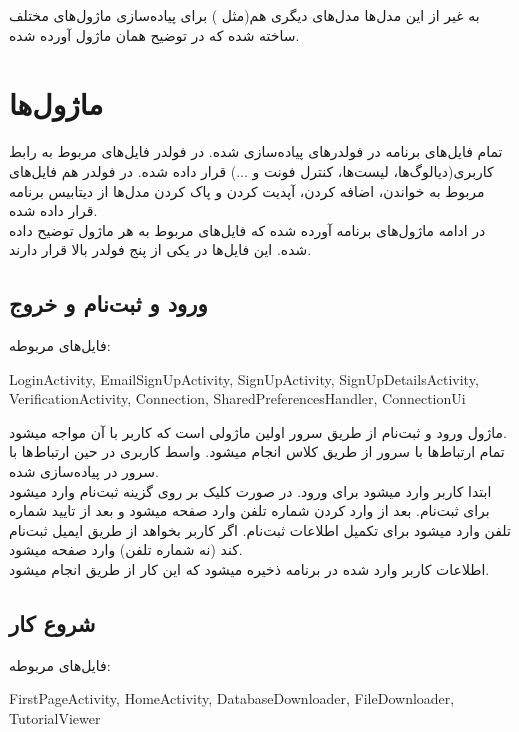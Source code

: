 \documentclass[11pt]{article}
\begin{document}
 به غیر از این مد‌ل‌ها مدل‌های دیگری هم(مثل  ) برای پیاده‌سازی ماژول‌های مختلف ساخته شده که در توضیح همان ماژول آورده شده.
 
 
\section{ماژول‌ها}
تمام فایل‌های برنامه در فولدر‌های 
پیاده‌سازی شده. در فولدر  فایل‌های مربوط به رابط کاربری(دیالوگ‌ها، لیست‌ها، کنترل فونت و ...) قرار داده شده. در فولدر  هم فایل‌های مربوط به خواندن، اضافه کردن، آپدیت کردن و پاک کردن مدل‌ها از دیتابیس برنامه قرار داده شده.\\
در ادامه ماژول‌های برنامه آورده شده که فایل‌های مربوط به هر ماژول توضیح داده شده. این فایل‌ها در یکی از پنج فولدر بالا قرار دارند.
\subsection{ورود و ثبت‌نام و خروج}
فایل‌های مربوطه:\\
\begin{latin}
LoginActivity, EmailSignUpActivity, SignUpActivity, SignUpDetailsActivity, VerificationActivity, Connection, SharedPreferencesHandler, ConnectionUi\\
\end{latin}

ماژول ورود و ثبت‌نام از طریق سرور اولین ماژولی است که کاربر با آن مواجه میشود. \\
تمام ارتباط‌ها با سرور از طریق کلاس  انجام میشود. واسط کاربری در حین ارتباط‌ها با سرور در  پیاده‌سازی شده.\\
 ابتدا کاربر وارد  میشود برای ورود. در صورت کلیک بر روی گزینه ثبت‌نام وارد  میشود برای ثبت‌نام. بعد از وارد کردن شماره تلفن وارد صفحه  میشود و بعد از تایید شماره تلفن وارد  میشود برای تکمیل اطلاعات ثبت‌نام. اگر کاربر بخواهد از طریق ایمیل ثبت‌نام کند (نه شماره تلفن) وارد صفحه  میشود. \\
اطلاعات کاربر وارد شده در  برنامه ذخیره میشود که این کار از طریق  انجام میشود.

\subsection{شروع کار}
فایل‌های مربوطه:\\
\begin{latin}
FirstPageActivity, HomeActivity, DatabaseDownloader, FileDownloader, TutorialViewer\\
\end{latin}
\end{document}
